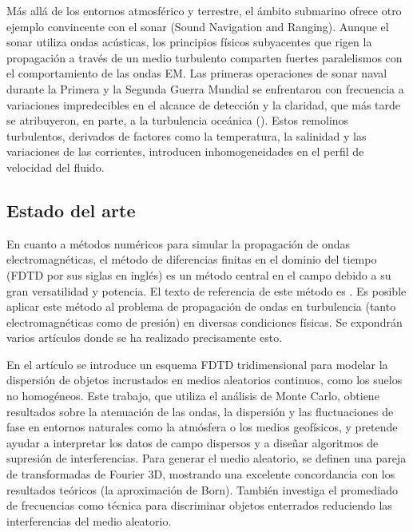 Más allá de los entornos atmosférico y terrestre, el ámbito submarino ofrece otro ejemplo convincente con el sonar (Sound Navigation and Ranging). Aunque el sonar utiliza ondas acústicas, los principios físicos subyacentes que rigen la propagación a través de un medio turbulento comparten fuertes paralelismos con el comportamiento de las ondas EM. Las primeras operaciones de sonar naval durante la Primera y la Segunda Guerra Mundial se enfrentaron con frecuencia a variaciones impredecibles en el alcance de detección y la claridad, que más tarde se atribuyeron, en parte, a la turbulencia oceánica (\cite{kajiwara_maritime_2024}). Estos remolinos turbulentos, derivados de factores como la temperatura, la salinidad y las variaciones de las corrientes, introducen inhomogeneidades en el perfil de velocidad del fluido.

\subsection{Estado del arte}

En cuanto a métodos numéricos para simular la propagación de ondas electromagnéticas, el método de diferencias finitas en el dominio del tiempo (FDTD por sus siglas en inglés) es un método central en el campo debido a su gran versatilidad y potencia. El texto de referencia de este método es \cite{taflove_computational_2010}. Es posible aplicar este método al problema de propagación de ondas en turbulencia (tanto electromagnéticas como de presión) en diversas condiciones físicas. Se expondrán varios artículos donde se ha realizado precisamente esto. 

En el artículo \cite{moss_finite-difference_2002} se introduce un esquema FDTD tridimensional para modelar la dispersión de objetos incrustados en medios aleatorios continuos, como los suelos no homogéneos. Este trabajo, que utiliza el análisis de Monte Carlo, obtiene resultados sobre la atenuación de las ondas, la dispersión y las fluctuaciones de fase en entornos naturales como la atmósfera o los medios geofísicos, y pretende ayudar a interpretar los datos de campo dispersos y a diseñar algoritmos de supresión de interferencias. Para generar el medio aleatorio, se definen una pareja de transformadas de Fourier 3D, mostrando una excelente concordancia con los resultados teóricos (la aproximación de Born). También investiga el promediado de frecuencias como técnica para discriminar objetos enterrados reduciendo las interferencias del medio aleatorio.

